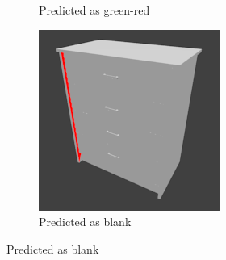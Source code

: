 \begin{figure}
\begin{subfigure}{.3\textwidth}
		\caption{Predicted as green-red}
		\label{fig:small-features-b}
	\end{subfigure}
	\begin{subfigure}{.3\textwidth}
		\centering
		\includegraphics[width=.8\textwidth]{images/dresser_0215_2_010.png}
		\caption{Predicted as blank}
		\label{fig:small-features-c}
	\end{subfigure}
	

\end{figure}
